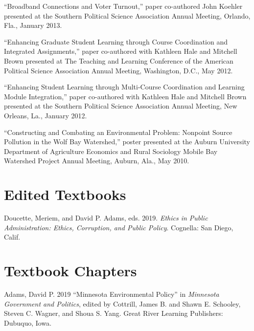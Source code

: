 \documentclass[11pt,letterpaper]{article}
\renewenvironment{itemize}{
  \begin{list}{}{
    \setlength{\leftmargin}{1.5em}
    \setlength{\itemsep}{0.25em}
    \setlength{\parskip}{0pt}
    \setlength{\parsep}{0.25em}
  }
}{
  \end{list}
}
\begin{document}
\begin{itemize}
		\item ``Broadband Connections and Voter Turnout,'' paper co-authored John Koehler presented at the Southern Political Science Association Annual Meeting, Orlando, Fla., January 2013.
		
		\item ``Enhancing Graduate Student Learning through Course Coordination and Integrated Assignments,'' paper co-authored with Kathleen Hale and Mitchell Brown presented at The Teaching and Learning Conference of the American Political Science Association Annual Meeting, Washington, D.C., May 2012.
		
		\item ``Enhancing Student Learning through Multi-Course Coordination and Learning Module Integration,'' paper co-authored with Kathleen Hale and Mitchell Brown presented at the Southern Political Science Association Annual Meeting, New Orleans, La., January 2012.
		
		\item ``Constructing and Combating an Environmental Problem: Nonpoint Source Pollution in the Wolf Bay Watershed,'' poster presented at the Auburn University Department of Agriculture Economics and Rural Sociology Mobile Bay Watershed Project Annual Meeting, Auburn, Ala., May 2010.
	\end{itemize}
	
\section*{Edited Textbooks}
	\begin{itemize}
		\item Doucette, Meriem, and David P. Adams, eds. 2019. \emph{Ethics in Public Administration: Ethics, Corruption, and Public Policy}. Cognella: San Diego, Calif. 
	\end{itemize}

\section*{Textbook Chapters}
	\begin{itemize}
		\item Adams, David P. 2019 ``Minnesota Environmental Policy'' in \textit{Minnesota Government and Politics}, edited by Cottrill, James B. and Shawn E. Schooley, Steven C. Wagner, and Shoua S. Yang. Great River Learning Publishers: Dubuquo, Iowa. 
	\end{itemize}
		
\end{document}

